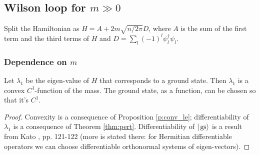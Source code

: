 \subsection{Wilson loop for $m \gg 0$}
Split the Hamiltonian as $H = A + 2m\sqrt{n/2\pi} D$, where $A$ is the sum of the first term and the third terms of $H$ and $D = \sum_l (-1)^l \psi_l^\dagger \psi_l$.
\subsubsection{Dependence on $m$}
\begin{proposition}\label{p:dep_m}
Let $\lambda_1$ be the eigen-value of $H$ that corresponds to a ground state. Then $\lambda_1$ is a convex $C^1$-function of the mass. The ground state, as a function, can be chosen so that it's $C^1$.
\end{proposition}
\begin{proof}
Convexity is a consequence of Proposition \ref{p:conv_le}; differentiability of $\lambda_1$ is a consequence of Theorem \ref{thm:pert}. Differentiability of $|\operatorname{gs}\rangle$ is a result from Kato \cite{kato}, pp. 121-122 (more is stated there: for Hermitian differentiable operators we can choose differentiable orthonormal systems of eigen-vectors).
\end{proof}

